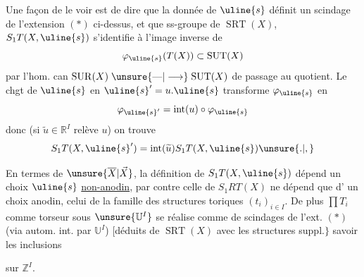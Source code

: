 
Une façon de le voir est de dire que
la donnée de $\uline{s}$ définit un scindage
 de
l'extension $(*)$ ci-dessus, et que 
ss-groupe de $\operatorname{SRT}(X)$,
$S_1T(X,\uline{s})$ s'identifie
à l'image inverse de
\[
\varphi_{\uline{s}}(T(X))\subset\operatorname{SUT}(X)
\]
par l'hom. can
$\operatorname{SUR}(X)\mathrel{\unsure{\text{---}|\longrightarrow}}\operatorname{SUT}(X)$
de passage au quotient. Le chgt de
$\uline{s}$ en $\uline{s}'=u.\uline{s}$
transforme $\varphi_{\uline{s}}$ en
\[
\varphi_{\uline{s}'}=\operatorname{int}(u)\circ\varphi_{\uline{s}}
\]
donc (si $\widetilde u\in\mathbb R^I$ relève $u$) on trouve
\[
S_1T(X,\uline{s}')
=\operatorname{int}(\widetilde u)S_1T(X,\uline{s})\unsure{.|,}
\]

En termes de $\unsure{\overline X|\vec X}$, la définition de
$S_1T(X,\uline{s})$
dépend un choix $\uline{s}$ \uline{non-anodin},
par contre celle de $S_1RT(X)$ ne dépend que d'
un choix anodin, celui de la famille des
structures toriques $(t_i)_{i\in I}$.
De plus $\prod T_i$ comme
torseur sous $\unsure{\mathbb U^I}$ se réalise
comme  de scindages de l'ext. $(*)$
(via autom. int. par $\mathbb U^I$)
$\bigl[$déduits de $\operatorname{SRT}(X)$
avec les structures suppl.$\bigr\}$
savoir\unsure{)|,} les inclusions


 sur $\mathbb Z^I$.

